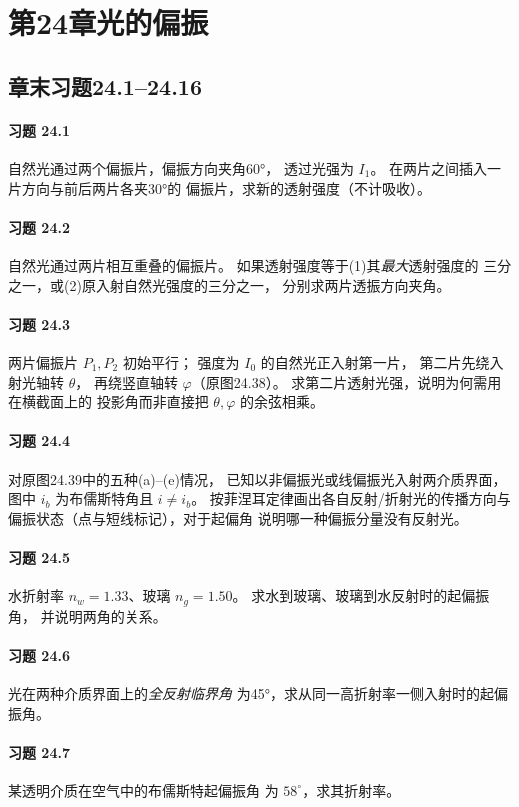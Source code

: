 \section*{第24章\quad 光的偏振}
\subsection*{章末习题24.1--24.16}
\paragraph{习题 24.1}
自然光通过两个偏振片，偏振方向夹角60°，
透过光强为 \(I_1\)。
在两片之间插入一片方向与前后两片各夹30°的
偏振片，求新的透射强度（不计吸收）。
\paragraph{习题 24.2}
自然光通过两片相互重叠的偏振片。
如果透射强度等于(1)其\emph{最大}透射强度的
三分之一，或(2)原入射自然光强度的三分之一，
分别求两片透振方向夹角。
\paragraph{习题 24.3}
两片偏振片 \(P_1,P_2\) 初始平行；
强度为 \(I_0\) 的自然光正入射第一片，
第二片先绕入射光轴转 \(\theta\)，
再绕竖直轴转 \(\varphi\)（原图24.38）。
求第二片透射光强，说明为何需用在横截面上的
投影角而非直接把 \(\theta,\varphi\) 的余弦相乘。
\paragraph{习题 24.4}
对原图24.39中的五种(a)--(e)情况，
已知以非偏振光或线偏振光入射两介质界面，
图中 \(i_b\) 为布儒斯特角且 \(i\ne i_b\)。
按菲涅耳定律画出各自反射/折射光的传播方向与
偏振状态（点与短线标记），对于起偏角
说明哪一种偏振分量没有反射光。
\paragraph{习题 24.5}
水折射率 \(n_w=1.33\)、玻璃 \(n_g=1.50\)。
求水到玻璃、玻璃到水反射时的起偏振角，
并说明两角的关系。
\paragraph{习题 24.6}
光在两种介质界面上的\emph{全反射临界角}
为45°，求从同一高折射率一侧入射时的起偏振角。
\paragraph{习题 24.7}
某透明介质在空气中的布儒斯特起偏振角
为 \(58^\circ\)，求其折射率。
